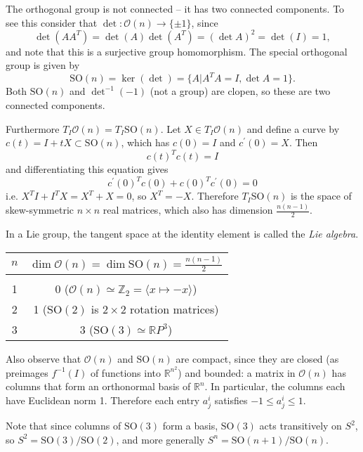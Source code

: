 \begin{xmpl}
\begin{enumerate}
{      The orthogonal group is not connected -- it has two connected
      components. To see this consider that
      $\det: \mathcal{O}(n) \to \{ \pm 1 \}$,
      since
      $$
        \det(A A^T)
      = \det (A) \det (A^T)
      = (\det A)^2
      = \det(I) = 1,
      $$
      and note that this is a surjective group homomorphism.
      The special orthogonal group is given by
      $$
        \mathrm{SO}(n)
      = \ker(\det)
      = \{A \vert A^TA = I, \det A = 1 \}.
      $$
      Both
      $\mathrm{SO}(n)$ and $\det^{-1}(-1)$ (not a group) are clopen,
      so these are two connected components.

      Furthermore $T_I \mathcal{O}(n) = T_I \mathrm{SO}(n)$. Let
      $X \in T_I \mathcal{O}(n)$ and define a curve by
      $c(t) = I + tX \subset \mathrm{SO}(n)$, which has $c(0) = I$ and
      $c^\prime(0) = X$. Then
      $$
      c(t)^T c(t) = I
      $$
      and differentiating this equation gives
      $$
        c^\prime(0)^T
        c(0)
      + c(0)^T c^\prime(0)
      = 0
      $$
      i.e. $X^TI + I^T X = X^T + X = 0$, so $X^T = -X$. Therefore
      $T_I\mathrm{SO}(n)$ is the space of skew-symmetric $n \times n$
      real matrices, which also has dimension
      $\frac{n(n-1)}{2}$.
    }
  \end{enumerate}
\end{xmpl}

In a Lie group, the tangent space at the identity element is called
the \emph{Lie algebra}.

\begin{tabular}{c | c}
  $n$ &
  $\dim \mathcal{O}(n) = \dim \mathrm{SO}(n) = \frac{n(n-1)}{2}$ \\
  \hline \\
  1 & 0 ($\mathcal{O}(n) \simeq \mathbb{Z}_2 = \langle x \mapsto -x \rangle$) \\
  2 & 1 ($\mathrm{SO}(2)$ is $2 \times 2$ rotation matrices) \\
  3 & 3 ($\mathrm{SO}(3) \simeq \mathbb{R}P^3$)
\end{tabular}
Also observe that $\mathcal{O}(n)$ and $\mathrm{SO}(n)$ are compact,
since they are closed (as preimages $f^{-1}(I)$ of functions into
$\mathbb{R}^{n^2}$) and bounded: a matrix in
$\mathcal{O}(n)$ has columns that form an orthonormal basis of
$\mathbb{R}^n$. In particular, the columns each have Euclidean norm 1.
Therefore each entry $a^i_j$ satisfies $-1 \leq a^i_j \leq 1$.

Note that since columns of $\mathrm{SO}(3)$ form a basis,
$\mathrm{SO}(3)$ acts transitively on $S^2$, so
$S^2 = \mathrm{SO}(3) / \mathrm{SO}(2)$, and more generally
$S^n = \mathrm{SO}(n+1) / \mathrm{SO}(n)$.

